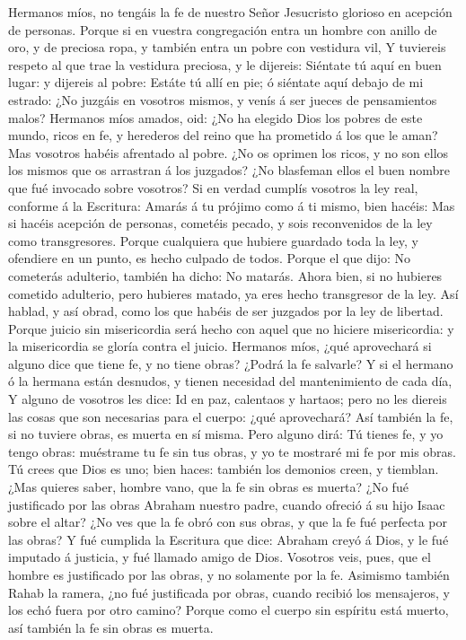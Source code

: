  Hermanos míos, no tengáis la fe de nuestro Señor Jesucristo
glorioso en acepción de personas.  Porque si en vuestra
congregación entra un hombre con anillo de oro, y de preciosa ropa, y
también entra un pobre con vestidura vil,  Y tuviereis
respeto al que trae la vestidura preciosa, y le dijereis: Siéntate tú
aquí en buen lugar: y dijereis al pobre: Estáte tú allí en pie; ó
siéntate aquí debajo de mi estrado:  ¿No juzgáis en vosotros
mismos, y venís á ser jueces de pensamientos malos? 
Hermanos míos amados, oid: ¿No ha elegido Dios los pobres de este mundo,
ricos en fe, y herederos del reino que ha prometido á los que le aman?
 Mas vosotros habéis afrentado al pobre. ¿No os oprimen los
ricos, y no son ellos los mismos que os arrastran á los juzgados?
 ¿No blasfeman ellos el buen nombre que fué invocado sobre
vosotros?  Si en verdad cumplís vosotros la ley real,
conforme á la Escritura: Amarás á tu prójimo como á ti mismo, bien
hacéis:  Mas si hacéis acepción de personas, cometéis
pecado, y sois reconvenidos de la ley como transgresores. 
Porque cualquiera que hubiere guardado toda la ley, y ofendiere en un
punto, es hecho culpado de todos.  Porque el que dijo: No
cometerás adulterio, también ha dicho: No matarás. Ahora bien, si no
hubieres cometido adulterio, pero hubieres matado, ya eres hecho
transgresor de la ley.  Así hablad, y así obrad, como los
que habéis de ser juzgados por la ley de libertad.  Porque
juicio sin misericordia será hecho con aquel que no hiciere
misericordia: y la misericordia se gloría contra el juicio.
 Hermanos míos, ¿qué aprovechará si alguno dice que tiene
fe, y no tiene obras? ¿Podrá la fe salvarle?  Y si el
hermano ó la hermana están desnudos, y tienen necesidad del
mantenimiento de cada día,  Y alguno de vosotros les dice:
Id en paz, calentaos y hartaos; pero no les diereis las cosas que son
necesarias para el cuerpo: ¿qué aprovechará?  Así también
la fe, si no tuviere obras, es muerta en sí misma.  Pero
alguno dirá: Tú tienes fe, y yo tengo obras: muéstrame tu fe sin tus
obras, y yo te mostraré mi fe por mis obras.  Tú crees que
Dios es uno; bien haces: también los demonios creen, y tiemblan.
 ¿Mas quieres saber, hombre vano, que la fe sin obras es
muerta?  ¿No fué justificado por las obras Abraham nuestro
padre, cuando ofreció á su hijo Isaac sobre el altar?  ¿No
ves que la fe obró con sus obras, y que la fe fué perfecta por las
obras?  Y fué cumplida la Escritura que dice: Abraham creyó
á Dios, y le fué imputado á justicia, y fué llamado amigo de Dios.
 Vosotros veis, pues, que el hombre es justificado por las
obras, y no solamente por la fe.  Asimismo también Rahab la
ramera, ¿no fué justificada por obras, cuando recibió los mensajeros, y
los echó fuera por otro camino?  Porque como el cuerpo sin
espíritu está muerto, así también la fe sin obras es muerta.

